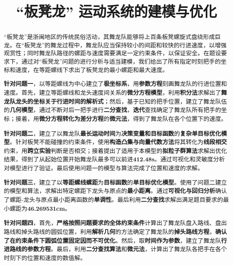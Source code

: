 \documentclass[a4paper]{article}
\title{“板凳龙” 运动系统的建模与优化}
\date{} %
\begin{document}
	\maketitle
	\vspace{-6em} %
	\begin{abstract}
		“板凳龙”是浙闽地区的传统民俗活动，其舞龙队能够将上百条板凳螺旋式盘绕形成巨龙。在“板凳龙”的舞龙过程中，舞龙队应当保持较小的间距和较快的行进速度，以增强观赏性；同时舞龙队路径的螺距与速度需要满足一定约束条件，以保证安全。在题设要求下，通过对“板凳龙”问题的进行分析与适当建模，我们给出了所有指定时刻把手的坐标和速度，在等距螺线下求出了板凳龙的最小螺距和最大速度。

		\hspace{0.2em}\textbf{针对问题一}，以等距螺线为中心建立了\textbf{极坐标系}，用\textbf{参数方程}刻画舞龙队的行进位置和速度。首先，建立等距螺线和龙头速度间关系的\textbf{微分方程模型}，利用\textbf{积分法}求解出了\textbf{舞龙队龙头的坐标关于行进时间的解析式}；然后，基于已知的把手位置，建立了舞龙队伍的\textbf{几何模型}，通过不断对后一把手进行\textbf{二分查找}，\textbf{迭代}查找确定了舞龙队所有把手的坐标；接着，用\textbf{微分方程转化为差分方程}的\textbf{微元法}，得到了舞龙队在各个位置下的速度。

		\textbf{针对问题二}，建立了以舞龙队\textbf{最长运动时间}为\textbf{决策变量和目标函数}的\textbf{复杂单目标优化模型}。针对板凳不能碰撞的约束条件，使用\textbf{构造凸集与向量代数方法}将其转化为\textbf{线段相交}约束，用\textbf{跨立实验}判断是否相交；接着提出了适用于本模型的\textbf{拟粒子群算法}求解出优化结果，得到了从起始位置开始舞龙队最多可以前进\textbf{412.48s}。通过可视化和灵敏度分析对模型进行了验证。最后使用问题一的模型与算法完成了位置和速度的求解。

		\textbf{针对问题三}，建立了以\textbf{等距螺线螺距}为\textbf{目标函数}的\textbf{单目标优化模型}。使用了问题二建立的模型和算法，求解出特定螺距下龙头与原点的\textbf{最小距离}。通过\textbf{可视化与回归分析}确认了螺距-龙头与原点最小距离函数的\textbf{单调性}。最后利用\textbf{二分查找}求解出满足题目要求的最小螺距为\textbf{46.269531cm}。

		\textbf{针对问题四}，首先，\textbf{严格按照问题要求的全体约束条件}计算出了舞龙队盘入路线、盘出路线和掉头路线的圆弧位置，利用\textbf{解析几何}的方法确定了舞龙队的\textbf{掉头路线方程}，\textbf{确认了在约束条件下圆弧位置固定因而不可优化}。然后，取\textbf{时间作为参数}，建立了舞龙队\textbf{行进路线的参数方程}。最后，利用\textbf{二分查找算法}和\textbf{微元法}，计算出了舞龙队各把手在各个时刻下的位置和速度的数值解。


\end{abstract}
\end{document}
